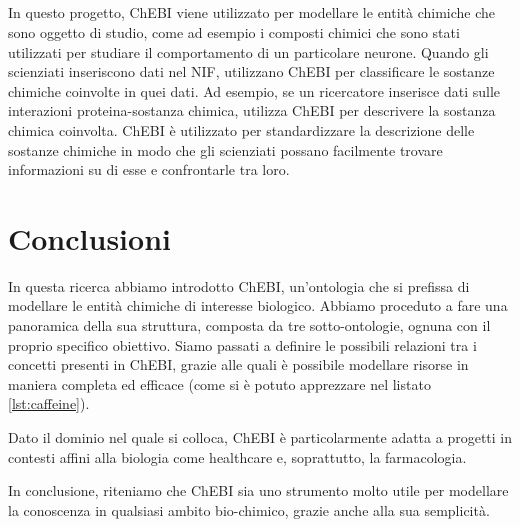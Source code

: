 \documentclass[12pt,a4paper,openright,twoside]{book}
\begin{document}
\paragraph{} In questo progetto, ChEBI viene utilizzato per modellare le entità chimiche che sono oggetto di studio, come ad esempio i composti chimici che sono stati utilizzati per studiare il comportamento di un particolare neurone.
Quando gli scienziati inseriscono dati nel NIF, utilizzano ChEBI per classificare le sostanze chimiche coinvolte in quei dati.
Ad esempio, se un ricercatore inserisce dati sulle interazioni proteina-sostanza chimica, utilizza ChEBI per descrivere la sostanza chimica coinvolta.
ChEBI è utilizzato per standardizzare la descrizione delle sostanze chimiche in modo che gli scienziati possano facilmente trovare informazioni su di esse e confrontarle tra loro.

\chapter{Conclusioni}
\label{chap:conclusions}
In questa ricerca abbiamo introdotto ChEBI, un'ontologia che si prefissa di modellare le entità chimiche di interesse biologico. Abbiamo proceduto a fare una panoramica della sua struttura, composta da tre sotto-ontologie, ognuna con il proprio specifico obiettivo. Siamo passati a definire le possibili relazioni tra i concetti presenti in ChEBI, grazie alle quali è possibile modellare risorse in maniera completa ed efficace (come si è potuto apprezzare nel listato \ref{lst:caffeine}).

Dato il dominio nel quale si colloca, ChEBI è particolarmente adatta a progetti in contesti affini alla biologia come healthcare e, soprattutto, la farmacologia.

In conclusione, riteniamo che ChEBI sia uno strumento molto utile per modellare la conoscenza in qualsiasi ambito bio-chimico, grazie anche alla sua semplicità.
\end{document}
